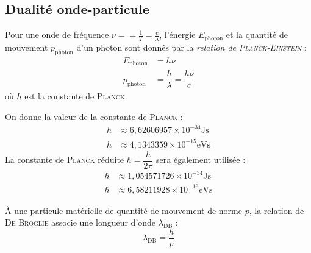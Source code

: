 \documentclass[11pt,a4paper,fleqn,pdftex]{report}
\begin{document}
\subsection{Dualité onde-particule} %
\label{sub:dualite_onde_particule}
\begin{dfn}
   Pour une onde de fréquence $\nu = =\frac{1}{T} = \frac{c}{\lambda}$, l'énergie $E_\text{photon}$ et la quantité de mouvement $p_\text{photon}$ d'un photon sont donnés par la \emph{relation de \textsc{Planck}-\textsc{Einstein}} :
   \begin{subequations}
      \begin{align}
      E_\text{photon} &= h\nu \\
      p_\text{photon} &= \dfrac{h}{\lambda} = \dfrac{h\nu}{c}
      \end{align}
   \end{subequations}
   où $h$ est la constante de \textsc{Planck}
\end{dfn}
On donne la valeur de la constante de \textsc{Planck} : 
\begin{align*}
h &\approx  6,626 069 57 \times 10^{-34}  \si{\joule\second} \\
h &\approx 4,134 335 9 \times 10^{-15} \si{\electronvolt\second}
\end{align*}
La constante de \textsc{Planck} réduite $\hbar = \dfrac{h}{2\pi}$ sera également utilisée : 
\begin{align*}
   \hbar &\approx 1,054 571 726 \times 10^{-34} \si{\joule\second} \\
   \hbar &\approx 6,582 119 28 \times 10^{-16} \si{\electronvolt\second}
\end{align*}
\begin{itheorem}
   À une particule matérielle de quantité de mouvement de norme $p$, la relation de \textsc{De Broglie} associe une longueur d'onde $\lambda_\text{DB}$ : 
   \begin{equation}
   \lambda_\text{DB} = \dfrac{h}{p}
   \end{equation}
\end{itheorem}
\end{document}
